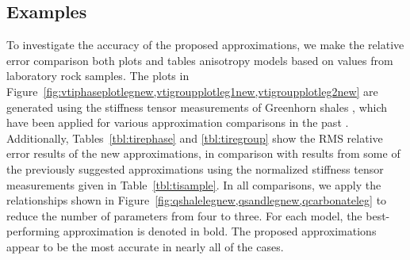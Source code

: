\subsection{Examples}

To investigate the accuracy of the proposed approximations, we make the relative error comparison  both plots and tables  anisotropy models based on values from laboratory rock samples. 
The plots in Figure~\ref{fig:vtiphaseplotlegnew,vtigroupplotleg1new,vtigroupplotleg2new} are generated using the stiffness tensor measurements of Greenhorn shales \cite[]{jw}, which have been applied for various approximation comparisons in the past \cite[e.g.][]{joethesis,fomel,stovas2010,farra}. 
Additionally, Tables~\ref{tbl:tirephase} and \ref{tbl:tiregroup} show the RMS relative error results of the new approximations, in comparison with results from some of the previously suggested approximations using the normalized stiffness tensor measurements given in Table~\ref{tbl:tisample}.  In all comparisons, we apply the relationships shown in Figure~\ref{fig:qshalelegnew,qsandlegnew,qcarbonateleg} to reduce the number of parameters from four to three.
For each model, the best-performing approximation is denoted in  bold. The proposed approximations appear to be the most accurate in nearly all of the cases.


